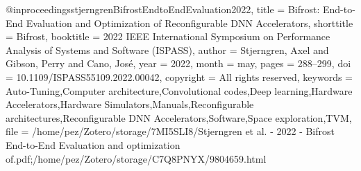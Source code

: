 @inproceedings{stjerngrenBifrostEndtoEndEvaluation2022,
  title = {Bifrost: {{End-to-End Evaluation}} and Optimization of {{Reconfigurable DNN Accelerators}}},
  shorttitle = {Bifrost},
  booktitle = {2022 {{IEEE International Symposium}} on {{Performance Analysis}} of {{Systems}} and {{Software}} ({{ISPASS}})},
  author = {Stjerngren, Axel and Gibson, Perry and Cano, Jos{\'e}},
  year = {2022},
  month = may,
  pages = {288--299},
  doi = {10.1109/ISPASS55109.2022.00042},
  copyright = {All rights reserved},
  keywords = {Auto-Tuning,Computer architecture,Convolutional codes,Deep learning,Hardware Accelerators,Hardware Simulators,Manuals,Reconfigurable architectures,Reconfigurable DNN Accelerators,Software,Space exploration,TVM},
  file = {/home/pez/Zotero/storage/7MI5SLI8/Stjerngren et al. - 2022 - Bifrost End-to-End Evaluation and optimization of.pdf;/home/pez/Zotero/storage/C7Q8PNYX/9804659.html}
}
